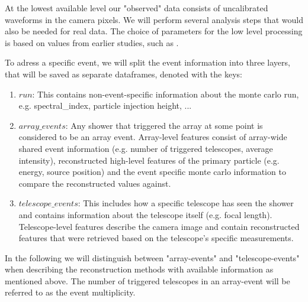 
At the lowest available level our "observed" data consists of uncalibrated waveforms 
in the camera pixels.
We will perform several analysis steps that would also be needed for real data.
The choice of parameters for the low level processing 
is based on values from earlier studies, such as \cite{kai_diss}.

To adress a specific event, we will split the event information into
three layers, that will be saved as separate dataframes, denoted with the keys:
\begin{enumerate}
    \item{$run$: This contains non-event-specific information about the monte carlo run, e.g.
    spectral\_index, particle injection height, ...}
    \item{$array\_events$: Any shower that triggered the array at some point 
    is considered to be an array event.
    Array-level features consist of array-wide shared event information 
    (e.g. number of triggered telescopes, average intensity),
    reconstructed high-level features of the primary particle (e.g. energy, source position) and the 
    event specific monte carlo information to compare the reconstructed values against.}
    \item{$telescope\_events$: This includes how a specific telescope has seen the shower and
    contains information about the telescope itself (e.g. focal length). Telescope-level features 
    describe the camera image and contain reconstructed features that were retrieved based on 
    the telescope's specific measurements.}
\end{enumerate}
In the following we will 
distinguish between "array-events" and "telescope-events" when describing the reconstruction methods
with available information as mentioned above.
The number of triggered telescopes in an array-event 
will be referred to as the event multiplicity.

